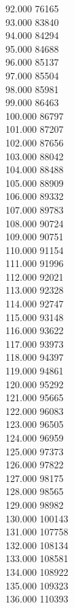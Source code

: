 { 92.000	76165 \\
 93.000	83840 \\
 94.000	84294 \\
 95.000	84688 \\
 96.000	85137 \\
 97.000	85504 \\
 98.000	85981 \\
 99.000	86463 \\
 100.000	86797 \\
 101.000	87207 \\
 102.000	87656 \\
 103.000	88042 \\
 104.000	88488 \\
 105.000	88909 \\
 106.000	89332 \\
 107.000	89783 \\
 108.000	90724 \\
 109.000	90751 \\
 110.000	91154 \\
 111.000	91996 \\
 112.000	92021 \\
 113.000	92328 \\
 114.000	92747 \\
 115.000	93148 \\
 116.000	93622 \\
 117.000	93973 \\
 118.000	94397 \\
 119.000	94861 \\
 120.000	95292 \\
 121.000	95665 \\
 122.000	96083 \\
 123.000	96505 \\
 124.000	96959 \\
 125.000	97373 \\
 126.000	97822 \\
 127.000	98175 \\
 128.000	98565 \\
 129.000	98982 \\
 130.000	100143 \\
 131.000	107758 \\
 132.000	108134 \\
 133.000	108581 \\
 134.000	108922 \\
 135.000	109323 \\
 136.000	110393 \\
}
